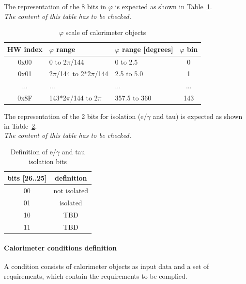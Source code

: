 The representation of the 8 bits in $\varphi$ is expected as shown in Table~\ref{tab:gtl:calo_phi_scale}.\\
\textit{The content of this table has to be checked.}
 
\begin{table}[htdp]
\begin{center}
\begin{tabular}{|c|l|l|c|}\hline
HW index & $\varphi$ range & $\varphi$ range [degrees] & $\varphi$ bin\\\hline\hline
0x00 & 0 to 2$\pi$/144 & 0 to 2.5 & 0\\\hline
0x01 & 2$\pi$/144 to 2$*$2$\pi$/144 & 2.5 to 5.0 & 1\\\hline
... & ... & ... & ...\\\hline
0x8F & 143$*$2$\pi$/144 to 2$\pi$ & 357.5 to 360 & 143\\\hline
\end{tabular}
\end{center}
\caption{$\varphi$ scale of calorimeter objects}
\label{tab:gtl:calo_phi_scale}
\end{table}

The representation of the 2 bits for isolation (e/$\gamma$ and tau) is expected as shown in Table~\ref{tab:gtl:eg_tau_iso_bits}.\\
\textit{The content of this table has to be checked.}

\begin{table}[ht]
\caption{Definition of e/$\gamma$ and tau isolation bits}
\vspace{5mm}
\centering
\begin{tabular}{|c|c|}\hline
bits [26..25] & definition \\\hline\hline
00 & not isolated \\
01 & isolated \\
10 & TBD \\
11 & TBD \\\hline
\end{tabular}
\label{tab:gtl:eg_tau_iso_bits}
\end{table}

\clearpage

\paragraph{Calorimeter conditions definition}\label{sec:gtl:calo_cond_def}

A condition consists of calorimeter objects as input data and a set of requirements, which contain the requirements to be complied.

